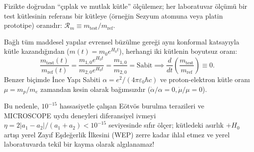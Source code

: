 \begin{theorem}
    \label{thm:boyutsuz_oranlar}
    Fizikte doğrudan ``çıplak ve mutlak kütle'' ölçülemez; her laboratuvar ölçümü bir test kütlesinin referans bir kütleye (örneğin Sezyum atomuna veya platin prototipe) oranıdır: $\mathcal{R}_m \equiv m_{\mathrm{test}} / m_{\mathrm{ref}}$.

    Bağlı tüm maddesel yapılar evrensel büzülme gereği aynı konformal katsayıyla kütle kazandığından ($m(t) = m_0 e^{H_0 t}$), herhangi iki kütlenin boyutsuz oranı:
    \begin{equation}
        \frac{m_{\mathrm{test}}(t)}{m_{\mathrm{ref}}(t)} = \frac{m_{1,0} e^{H_0 t}}{m_{2,0} e^{H_0 t}} = \frac{m_{1,0}}{m_{2,0}} = \text{Sabit} \implies \frac{d}{dt}\left( \frac{m_{\mathrm{test}}}{m_{\mathrm{ref}}} \right) \equiv 0.
        \label{eq:boyutsuz_kutle_korunumu}
    \end{equation}
    Benzer biçimde İnce Yapı Sabiti $\alpha = e^2 / (4\pi\varepsilon_0 \hbar c)$ ve proton-elektron kütle oranı $\mu = m_p / m_e$ zamandan kesin olarak bağımsızdır ($\dot{\alpha}/\alpha = 0, \dot{\mu}/\mu = 0$).

    Bu nedenle, $10^{-15}$ hassasiyetle çalışan Eötvös burulma terazileri ve MICROSCOPE uydu deneyleri diferansiyel ivmeyi $\eta = 2|a_1 - a_2|/(a_1 + a_2) < 10^{-15}$ seviyesinde sıfır ölçer; kütledeki asırlık $+H_0$ artışı yerel Zayıf Eşdeğerlik İlkesini (WEP) zerre kadar ihlal etmez ve yerel laboratuvarda tekil bir kayma olarak algılanamaz!
\end{theorem}

